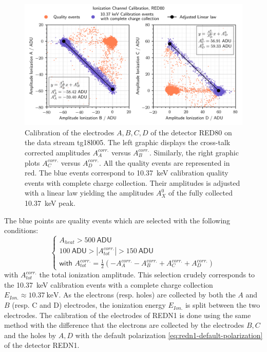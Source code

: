 \begin{figure}
\centering
\includegraphics[scale=1]{Figures/ElectrodesExperimental/ion_calibration.png}
\caption{Calibration of the electrodes $A,B,C,D$ of the detector RED80 on the data stream tg18l005. The left graphic displays the cross-talk corrected amplitudes $A_A^{corr.}$ versus $A_B^{corr.}$. Similarly, the right graphic plots $A_C^{corr.}$ versus $A_D^{corr.}$. All the quality events are represented in red. The blue events correspond to \SI{10.37}{\kilo\eV} calibration quality events with complete charge collection. Their amplitudes is adjusted with a linear law yielding the amplitudes $A_X^0$ of the fully collected \SI{10.37}{\kilo\eV} peak.}
\label{fig:ion-calibration}
\end{figure}

The blue points are quality events which are selected with the following conditions:
\begin{equation}
\begin{cases}
A_{heat} > \SI{500}{\textsf{ADU}} \\
\SI{100}{\textsf{ADU}} > |A_{tot}^{corr.}| > \SI{150}{\textsf{ADU}} \\
\textsf{with  } A_{tot}^{corr.} = \frac{1}{2} \left( -A_A^{corr.}-A_B^{corr.}+A_C^{corr.}+A_D^{corr.} \right)
\end{cases}
\end{equation}
with $A_{tot}^{corr.}$ the total ionization amplitude. This selection crudely corresponds to the \SI{10.37}{\kilo\eV} calibration events with a complete charge collection $E_{Ion.} \approx \SI{10.37}{\kilo\eV}$. As the electrons (resp. holes) are collected by both the $A$ and $B$ (resp. C and D) electrodes, the ionization energy $E_{Ion.}$ is split between the two electrodes. The calibration of the electrodes of REDN1 is done using the same method with the difference that the electrons are collected by the electrodes $B,C$ and the holes by $A,D$ with the default polarization \ref{eq:redn1-default-polarization} of the detector REDN1.

